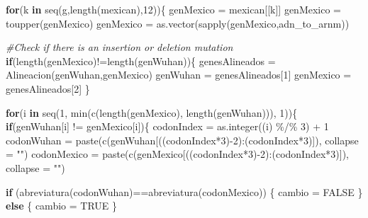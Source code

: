 \documentclass[
  12pt,
]{article}
\newenvironment{Shaded}{\begin{snugshade}}{\end{snugshade}}
\newcommand{\AttributeTok}[1]{\textcolor[rgb]{0.77,0.63,0.00}{#1}}
\newcommand{\CommentTok}[1]{\textcolor[rgb]{0.56,0.35,0.01}{\textit{#1}}}
\newcommand{\ConstantTok}[1]{\textcolor[rgb]{0.00,0.00,0.00}{#1}}
\newcommand{\ControlFlowTok}[1]{\textcolor[rgb]{0.13,0.29,0.53}{\textbf{#1}}}
\newcommand{\DecValTok}[1]{\textcolor[rgb]{0.00,0.00,0.81}{#1}}
\newcommand{\FunctionTok}[1]{\textcolor[rgb]{0.00,0.00,0.00}{#1}}
\newcommand{\NormalTok}[1]{#1}
\newcommand{\OtherTok}[1]{\textcolor[rgb]{0.56,0.35,0.01}{#1}}
\newcommand{\SpecialCharTok}[1]{\textcolor[rgb]{0.00,0.00,0.00}{#1}}
\newcommand{\StringTok}[1]{\textcolor[rgb]{0.31,0.60,0.02}{#1}}
\begin{document}
\begin{Shaded}
\begin{Highlighting}[]
      
      \ControlFlowTok{for}\NormalTok{(k }\ControlFlowTok{in} \FunctionTok{seq}\NormalTok{(g,}\FunctionTok{length}\NormalTok{(mexican),}\DecValTok{12}\NormalTok{))\{}
\NormalTok{        genMexico }\OtherTok{=}\NormalTok{ mexican[[k]]      }
\NormalTok{        genMexico }\OtherTok{=} \FunctionTok{toupper}\NormalTok{(genMexico)}
\NormalTok{        genMexico }\OtherTok{=} \FunctionTok{as.vector}\NormalTok{(}\FunctionTok{sapply}\NormalTok{(genMexico,adn\_to\_arnm))}
        
        \CommentTok{\#Check if there is an insertion or deletion mutation}
        \ControlFlowTok{if}\NormalTok{(}\FunctionTok{length}\NormalTok{(genMexico)}\SpecialCharTok{!=}\FunctionTok{length}\NormalTok{(genWuhan))\{}
\NormalTok{           genesAlineados }\OtherTok{=} \FunctionTok{Alineacion}\NormalTok{(genWuhan,genMexico)}
\NormalTok{           genWuhan }\OtherTok{=}\NormalTok{ genesAlineados[}\DecValTok{1}\NormalTok{]}
\NormalTok{           genMexico }\OtherTok{=}\NormalTok{ genesAlineados[}\DecValTok{2}\NormalTok{]}
\NormalTok{         \}}
        
        
        \ControlFlowTok{for}\NormalTok{(i }\ControlFlowTok{in} \FunctionTok{seq}\NormalTok{(}\DecValTok{1}\NormalTok{, }\FunctionTok{min}\NormalTok{(}\FunctionTok{c}\NormalTok{(}\FunctionTok{length}\NormalTok{(genMexico), }\FunctionTok{length}\NormalTok{(genWuhan))), }\DecValTok{1}\NormalTok{))\{}
          \ControlFlowTok{if}\NormalTok{(genWuhan[i] }\SpecialCharTok{!=}\NormalTok{ genMexico[i])\{}
\NormalTok{            codonIndex }\OtherTok{=} \FunctionTok{as.integer}\NormalTok{((i) }\SpecialCharTok{\%/\%} \DecValTok{3}\NormalTok{) }\SpecialCharTok{+} \DecValTok{1} 
\NormalTok{            codonWuhan }\OtherTok{=} \FunctionTok{paste}\NormalTok{(}\FunctionTok{c}\NormalTok{(genWuhan[((codonIndex}\SpecialCharTok{*}\DecValTok{3}\NormalTok{)}\SpecialCharTok{{-}}\DecValTok{2}\NormalTok{)}\SpecialCharTok{:}\NormalTok{(codonIndex}\SpecialCharTok{*}\DecValTok{3}\NormalTok{)]), }\AttributeTok{collapse =} \StringTok{""}\NormalTok{)}
\NormalTok{            codonMexico }\OtherTok{=} \FunctionTok{paste}\NormalTok{(}\FunctionTok{c}\NormalTok{(genMexico[((codonIndex}\SpecialCharTok{*}\DecValTok{3}\NormalTok{)}\SpecialCharTok{{-}}\DecValTok{2}\NormalTok{)}\SpecialCharTok{:}\NormalTok{(codonIndex}\SpecialCharTok{*}\DecValTok{3}\NormalTok{)]), }\AttributeTok{collapse =} \StringTok{""}\NormalTok{)}
            
            \ControlFlowTok{if}\NormalTok{ (}\FunctionTok{abreviatura}\NormalTok{(codonWuhan)}\SpecialCharTok{==}\FunctionTok{abreviatura}\NormalTok{(codonMexico)) \{}
\NormalTok{              cambio }\OtherTok{=} \ConstantTok{FALSE}
\NormalTok{            \} }\ControlFlowTok{else}\NormalTok{ \{}
\NormalTok{              cambio }\OtherTok{=} \ConstantTok{TRUE}
\NormalTok{            \}}
            

\end{Highlighting}
\end{Shaded}
\end{document}
